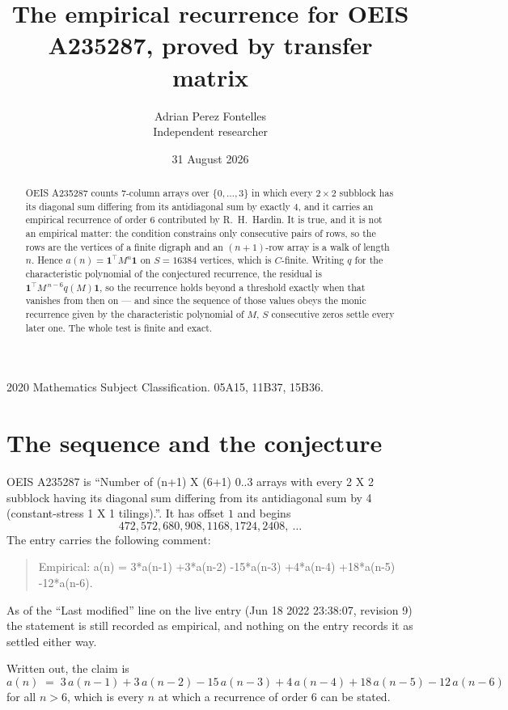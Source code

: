 \documentclass[11pt,a4paper]{article}
\title{The empirical recurrence for OEIS A235287, proved by transfer matrix}
\author{Adrian Perez Fontelles\\ \small Independent researcher}
\date{31 August 2026}
\theoremstyle{plain}
\theoremstyle{definition}
\begin{document}
\maketitle

\begin{abstract}
OEIS A235287 counts $7$-column arrays over $\{0,\dots,3\}$ in which every
$2\times2$ subblock has its diagonal sum differing from its antidiagonal sum by
exactly $4$, and it
carries an empirical recurrence of order $6$ contributed by R.~H.~Hardin. It is true,
and it is not an empirical matter: the condition constrains only consecutive pairs of rows,
so the rows are the vertices of a finite digraph and an $(n+1)$-row array is a walk of
length $n$. Hence $a(n)=\mathbf{1}^{\!\top}M^{n}\mathbf{1}$ on $S=16384$ vertices, which
is $C$-finite. Writing $q$ for the characteristic polynomial of the conjectured recurrence,
the residual is $\mathbf{1}^{\!\top}M^{\,n-6}q(M)\mathbf{1}$, so the recurrence
holds beyond a threshold exactly when that vanishes from then on --- and since the sequence
of those values obeys the monic recurrence given by the characteristic polynomial of $M$,
$S$ consecutive zeros settle every later one. The whole test is finite and exact.
\end{abstract}

\noindent\small 2020 Mathematics Subject Classification. 05A15, 11B37, 15B36.\normalsize

\section{The sequence and the conjecture}

OEIS A235287 is ``Number of (n+1) X (6+1) 0..3 arrays with every 2 X 2 subblock having its diagonal sum differing from its antidiagonal sum by 4 (constant-stress 1 X 1 tilings).''. It has offset
$1$ and begins
\[
472, 572, 680, 908, 1168, 1724, 2408,\ \dots
\]
The entry carries the following comment:
\begin{quote}\small
Empirical: a(n) = 3*a(n-1) +3*a(n-2) -15*a(n-3) +4*a(n-4) +18*a(n-5) -12*a(n-6).
\end{quote}
As of the ``Last modified'' line on the live entry (Jun 18 2022 23:38:07, revision 9) the statement is
still recorded as empirical, and nothing on the entry records it as settled either way.

Written out, the claim is
\begin{equation}\label{eq:conj}
a(n)\;=\;3\,a(n-1) + 3\,a(n-2) - 15\,a(n-3) + 4\,a(n-4) + 18\,a(n-5) - 12\,a(n-6)
\end{equation}
for all $n>6$, which is every $n$ at which a recurrence of order $6$ can be
stated.
\end{document}
